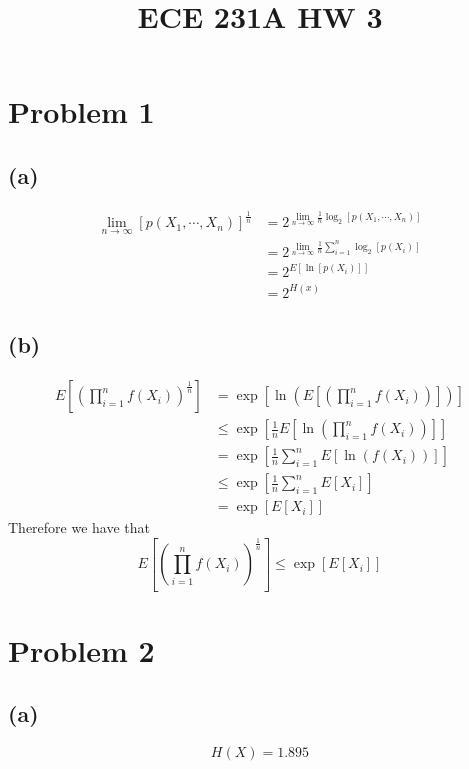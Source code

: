 
\title{ECE 231A HW 3}

\maketitle
\section*{Problem 1}
\subsection*{(a)}
\begin{align*}
    \lim_{n\to\infty}[p(X_1,\cdots,X_n)]^{\frac{1}{n}}&=
        2^{\lim_{n\to\infty}\frac{1}{n}\log_2[p(X_1,\cdots,X_n)]}\\
    &=2^{\lim_{n\to\infty}\frac{1}{n}\sum_{i=1}^n\log_2[p(X_i)]}\\
    &=2^{E[\ln[p(X_i)]]}\\
    &=\boxed{2^{H(x)}}
\end{align*}
\subsection*{(b)}
\begin{align*}
    E\left[\left(\prod_{i=1}^nf(X_i)\right)^{\frac{1}{n}}\right]&=
        \exp\left[\ln\left(E\left[\left(\prod_{i=1}^nf(X_i)\right)\right]\right)\right]\\
    &\leq \exp\left[\frac{1}{n}E\left[\ln\left(\prod_{i=1}^nf(X_i)\right)\right]\right]\\
    &=\exp\left[\frac{1}{n}\sum_{i=1}^nE\left[\ln\left(f(X_i)\right)\right]\right]\\
    &\leq \exp\left[\frac{1}{n}\sum_{i=1}^nE[X_i]\right]\\
    &=\exp\left[E[X_i]\right]
\end{align*}
Therefore we have that
$$
    \boxed{E\left[\left(\prod_{i=1}^nf(X_i)\right)^{\frac{1}{n}}\right]\leq \exp\left[E[X_i]\right]}
    $$
\section*{Problem 2}
\subsection*{(a)}
$$H(X)=\boxed{1.895}$$

